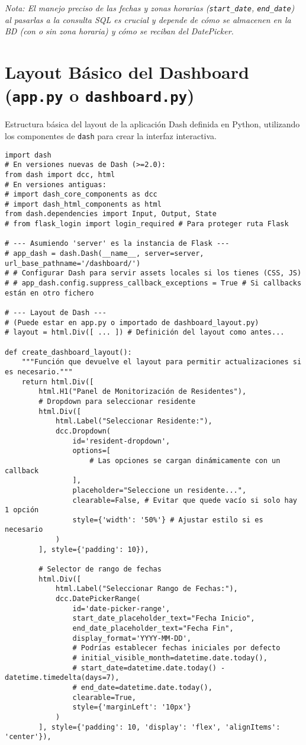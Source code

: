 \textit{Nota: El manejo preciso de las fechas y zonas horarias (\texttt{start\_date}, \texttt{end\_date}) al pasarlas a la consulta SQL es crucial y depende de cómo se almacenen en la BD (con o sin zona horaria) y cómo se reciban del DatePicker.}

\section{Layout Básico del Dashboard (\texttt{app.py} o \texttt{dashboard.py})}
\label{annex:code:dash_layout}
Estructura básica del layout de la aplicación Dash definida en Python, utilizando los componentes de \texttt{dash} para crear la interfaz interactiva.
\begin{lstlisting}[caption={Ejemplo de layout de Dash integrado en Flask.}, label={lst:dash_layout_code}]
import dash
# En versiones nuevas de Dash (>=2.0):
from dash import dcc, html
# En versiones antiguas:
# import dash_core_components as dcc
# import dash_html_components as html
from dash.dependencies import Input, Output, State
# from flask_login import login_required # Para proteger ruta Flask

# --- Asumiendo 'server' es la instancia de Flask ---
# app_dash = dash.Dash(__name__, server=server, url_base_pathname='/dashboard/')
# # Configurar Dash para servir assets locales si los tienes (CSS, JS)
# # app_dash.config.suppress_callback_exceptions = True # Si callbacks están en otro fichero

# --- Layout de Dash ---
# (Puede estar en app.py o importado de dashboard_layout.py)
# layout = html.Div([ ... ]) # Definición del layout como antes...

def create_dashboard_layout():
    """Función que devuelve el layout para permitir actualizaciones si es necesario."""
    return html.Div([
        html.H1("Panel de Monitorización de Residentes"),
        # Dropdown para seleccionar residente
        html.Div([
            html.Label("Seleccionar Residente:"),
            dcc.Dropdown(
                id='resident-dropdown',
                options=[
                    # Las opciones se cargan dinámicamente con un callback
                ],
                placeholder="Seleccione un residente...",
                clearable=False, # Evitar que quede vacío si solo hay 1 opción
                style={'width': '50%'} # Ajustar estilo si es necesario
            )
        ], style={'padding': 10}),

        # Selector de rango de fechas
        html.Div([
            html.Label("Seleccionar Rango de Fechas:"),
            dcc.DatePickerRange(
                id='date-picker-range',
                start_date_placeholder_text="Fecha Inicio",
                end_date_placeholder_text="Fecha Fin",
                display_format='YYYY-MM-DD',
                # Podrías establecer fechas iniciales por defecto
                # initial_visible_month=datetime.date.today(),
                # start_date=datetime.date.today() - datetime.timedelta(days=7),
                # end_date=datetime.date.today(),
                clearable=True,
                style={'marginLeft': '10px'}
            )
        ], style={'padding': 10, 'display': 'flex', 'alignItems': 'center'}),


\end{lstlisting}
